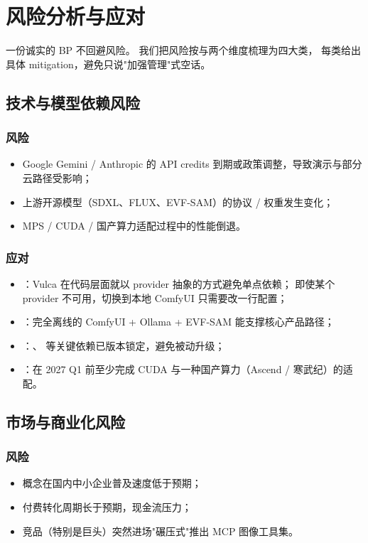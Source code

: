 \section{风险分析与应对}
\label{sec:risks}

一份诚实的 BP 不回避风险。
我们把风险按与两个维度梳理为四大类，
每类给出具体 mitigation，避免只说"加强管理"式空话。

\subsection{技术与模型依赖风险}

\subsubsection*{风险}
\begin{itemize}
  \item Google Gemini / Anthropic 的 API credits 到期或政策调整，导致演示与部分云路径受影响；
  \item 上游开源模型（SDXL、FLUX、EVF-SAM）的协议 / 权重发生变化；
  \item MPS / CUDA / 国产算力适配过程中的性能倒退。
\end{itemize}

\subsubsection*{应对}
\begin{itemize}
  \item {}：Vulca 在代码层面就以 provider 抽象的方式避免单点依赖；
  即使某个 provider 不可用，切换到本地 ComfyUI 只需要改一行配置；
  \item {}：完全离线的 ComfyUI + Ollama + EVF-SAM 能支撑核心产品路径；
  \item {}：、 等关键依赖已版本锁定，避免被动升级；
  \item {}：在 2027 Q1 前至少完成 CUDA 与一种国产算力（Ascend / 寒武纪）的适配。
\end{itemize}

\subsection{市场与商业化风险}

\subsubsection*{风险}
\begin{itemize}
  \item {} 概念在国内中小企业普及速度低于预期；
  \item 付费转化周期长于预期，现金流压力；
  \item 竞品（特别是巨头）突然进场"碾压式"推出 MCP 图像工具集。
\end{itemize}

